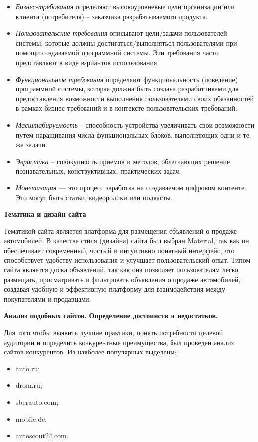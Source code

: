\begin{itemize}
    \item \textit{Бизнес-требования} определяют высокоуровневые цели организации или клиента (потребителя) – заказчика разрабатываемого продукта.
    \item \textit{Пользовательские требования} описывают цели/задачи пользователей системы, которые должны достигаться/выполняться пользователями при помощи создаваемой программной системы. Эти требования часто представляют в виде вариантов использования.
    \item \textit{Функциональные требования} определяют функциональность (поведение) программной системы, которая должна быть создана разработчиками для предоставления возможности выполнения пользователями своих обязанностей в рамках бизнес-требований и в контексте пользовательских требований.
    \item \textit{Масштабируемость} – способность устройства увеличивать свои возможности путем наращивания числа функциональных блоков, выполняющих одни и те же задачи.
    \item \textit{Эвристика} – совокупность приемов и методов, облегчающих решение познавательных, конструктивных, практических задач.
    \item \textit{Монетизация} — это процесс заработка на создаваемом  цифровом контенте. Это могут быть статьи, видеоролики или подкасты.
\end{itemize}
\bigskip

\textbf{Тематика и дизайн сайта}

Тематикой сайта является платформа для размещения объявлений о продаже автомобилей. В качестве стиля (дизайна) сайта был выбран Material, так как он обеспечивает современный, чистый и интуитивно понятный интерфейс, что способствует удобству использования и улучшает пользовательский опыт. Типом сайта является доска объявлений, так как она позволяет пользователям легко размещать, просматривать и фильтровать объявления о продаже автомобилей, создавая удобную и эффективную платформу для взаимодействия между покупателями и продавцами.
\bigskip

\textbf{Анализ подобных сайтов. Определение достоинств и недостатков.}

Для того чтобы выявить лучшие практики, понять потребности целевой аудитории и определить конкурентные преимущества, был проведен анализ сайтов конкурентов. Из наиболее популярных выделены:

\begin{itemize}
    \item auto.ru;
    \item drom.ru;
    \item sberauto.com;
    \item mobile.de;
    \item autoscout24.com.
\end{itemize}


